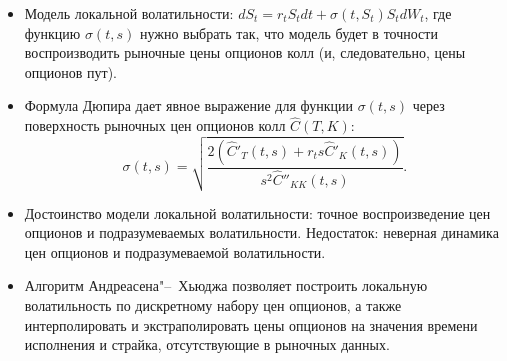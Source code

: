 \summary
\begin{itemize}
\item Модель локальной волатильности: $d S_t = r_tS_t dt + \sigma(t,S_t)S_t d W_t$, где функцию $\sigma(t,s)$ нужно выбрать так, что модель будет в точности воспроизводить рыночные цены опционов колл (и, следовательно, цены опционов пут).

\item Формула Дюпира дает явное выражение для функции $\sigma(t,s)$ через поверхность рыночных цен опционов колл $\hat C(T,K)$:
\[
\sigma(t,s) = \sqrt{\frac{2(\hat C'_T(t,s) + r_ts\hat C'_K(t,s))}{s^2\hat C''_{KK}(t,s)}}.
\]

\item Достоинство модели локальной волатильности: точное воспроизведение цен опционов и подразумеваемых волатильности.
Недостаток: неверная динамика цен опционов и подразумеваемой волатильности.

\item Алгоритм Андреасена"--~Хьюджа позволяет построить локальную волатильность по дискретному набору цен опционов, а также интерполировать и экстраполировать цены опционов на значения времени исполнения и страйка, отсутствующие в рыночных данных.
\end{itemize}
